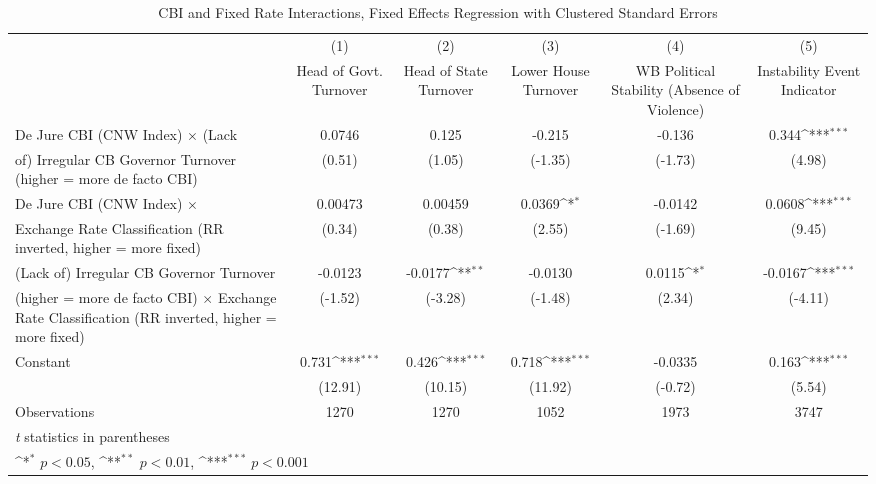 \begin{table}[htbp]\centering
\def\sym#1{\ifmmode^{#1}\else\(^{#1}\)\fi}
\caption{CBI and Fixed Rate Interactions, Fixed Effects Regression with Clustered Standard Errors \label{imultIndFE}}
\begin{tabular}{l*{5}{c}}
\toprule
                                        &\multicolumn{1}{c}{(1)}&\multicolumn{1}{c}{(2)}&\multicolumn{1}{c}{(3)}&\multicolumn{1}{c}{(4)}&\multicolumn{1}{c}{(5)}\\
                                        &\multicolumn{1}{c}{Head of Govt. Turnover}&\multicolumn{1}{c}{Head of State Turnover}&\multicolumn{1}{c}{Lower House Turnover}&\multicolumn{1}{c}{WB Political Stability (Absence of Violence)}&\multicolumn{1}{c}{Instability Event Indicator}\\
\midrule
De Jure CBI (CNW Index) $\times$ (Lack  &   0.0746         &    0.125         &   -0.215         &   -0.136         &    0.344\sym{***}\\
of) Irregular CB Governor Turnover (higher = more de facto CBI)&   (0.51)         &   (1.05)         &  (-1.35)         &  (-1.73)         &   (4.98)         \\
\addlinespace
De Jure CBI (CNW Index) $\times$        &  0.00473         &  0.00459         &   0.0369\sym{*}  &  -0.0142         &   0.0608\sym{***}\\
Exchange Rate Classification (RR inverted, higher = more fixed)&   (0.34)         &   (0.38)         &   (2.55)         &  (-1.69)         &   (9.45)         \\
\addlinespace
(Lack of) Irregular CB Governor Turnover&  -0.0123         &  -0.0177\sym{**} &  -0.0130         &   0.0115\sym{*}  &  -0.0167\sym{***}\\
(higher = more de facto CBI) $\times$ Exchange Rate Classification (RR inverted, higher = more fixed)&  (-1.52)         &  (-3.28)         &  (-1.48)         &   (2.34)         &  (-4.11)         \\
\addlinespace
Constant                                &    0.731\sym{***}&    0.426\sym{***}&    0.718\sym{***}&  -0.0335         &    0.163\sym{***}\\
                                        &  (12.91)         &  (10.15)         &  (11.92)         &  (-0.72)         &   (5.54)         \\
\midrule
Observations                            &     1270         &     1270         &     1052         &     1973         &     3747         \\
\bottomrule
\multicolumn{6}{l}{\footnotesize \textit{t} statistics in parentheses}\\
\multicolumn{6}{l}{\footnotesize \sym{*} \(p<0.05\), \sym{**} \(p<0.01\), \sym{***} \(p<0.001\)}\\
\end{tabular}
\end{table}
